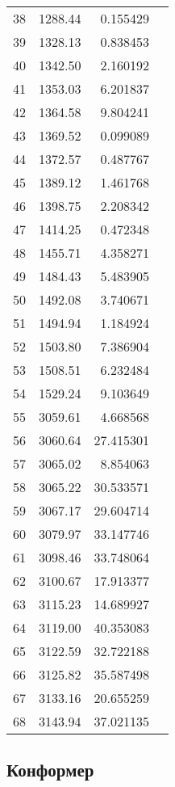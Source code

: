 \begin{tabular}{r|rr|l}
  38 &     1288.44  &  0.155429  & \\
  39 &     1328.13  &  0.838453  & \\
  40 &     1342.50  &  2.160192  & \\
  41 &     1353.03  &  6.201837  & \\
  42 &     1364.58  &  9.804241  & \\
  43 &     1369.52  &  0.099089  & \\
  44 &     1372.57  &  0.487767  & \\
  45 &     1389.12  &  1.461768  & \\
  46 &     1398.75  &  2.208342  & \\
  47 &     1414.25  &  0.472348  & \\
  48 &     1455.71  &  4.358271  & \\
  49 &     1484.43  &  5.483905  & \\
  50 &     1492.08  &  3.740671  & \\
  51 &     1494.94  &  1.184924  & \\
  52 &     1503.80  &  7.386904  & \\
  53 &     1508.51  &  6.232484  & \\
  54 &     1529.24  &  9.103649  & \\
  55 &     3059.61  &  4.668568  & \\
  56 &     3060.64  & 27.415301  & \\
  57 &     3065.02  &  8.854063  & \\
  58 &     3065.22  & 30.533571  & \\
  59 &     3067.17  & 29.604714  & \\
  60 &     3079.97  & 33.147746  & \\
  61 &     3098.46  & 33.748064  & \\
  62 &     3100.67  & 17.913377  & \\
  63 &     3115.23  & 14.689927  & \\
  64 &     3119.00  & 40.353083  & \\
  65 &     3122.59  & 32.722188  & \\
  66 &     3125.82  & 35.587498  & \\
  67 &     3133.16  & 20.655259  & \\
  68 &     3143.94  & 37.021135  & \\
  \bottomrule
  \end{tabular}
\normalsize

\subsection{Конформер \CC{}}

